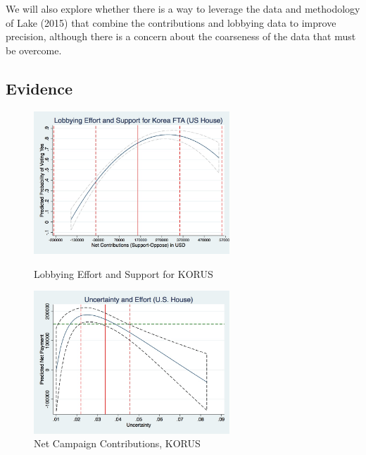 \documentclass[12pt]{article}
\begin{document}
We will also explore whether there is a way to leverage the data and methodology of Lake (2015) that combine the contributions and lobbying data to improve precision, although there is a concern about the coarseness of the data that must be overcome.

\subsection{Evidence}

\begin{figure}
\centering
\begin{minipage}{.5\textwidth}
  \centering
  \includegraphics[width=2.9in]{graph2.jpg}
  \caption{\small Lobbying Effort and Support for KORUS
	\label{fig:br}}
\end{minipage}%
\begin{minipage}{.5\textwidth}
  \centering
  \includegraphics[width=2.9in]{graph1.jpg}
  \caption{\small Net Campaign Contributions, KORUS
	\label{fig:g1}}
\end{minipage}
\end{figure}
\end{document}
